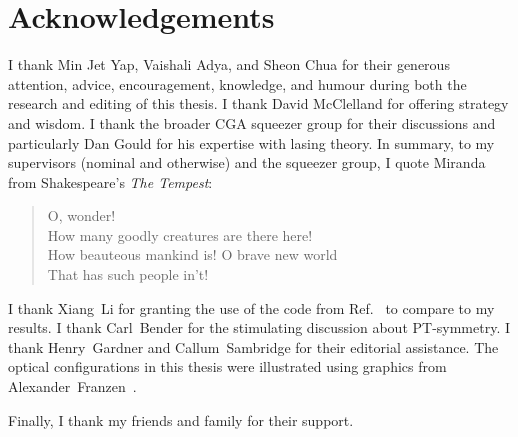 \chapter*{Acknowledgements}

I thank Min Jet Yap, Vaishali Adya, and Sheon Chua for their generous attention, advice, encouragement, knowledge, and humour during both the research and editing of this thesis.
I thank David McClelland for offering strategy and wisdom.
I thank the broader CGA squeezer group for their discussions and particularly Dan Gould for his expertise with lasing theory. %
In summary, to my supervisors (nominal and otherwise) and the squeezer group, I quote Miranda from Shakespeare's \emph{The Tempest}:
\begin{quote}
O, wonder! \\ How many goodly creatures are there here! \\ How beauteous mankind is! O brave new world \\ That has such people in't!
\end{quote}

I thank Xiang~Li for granting the use of the code from Ref.~\cite{liBroadbandSensitivityImprovement2020} to compare to my results. I thank Carl~Bender for the stimulating discussion about PT-symmetry.
I thank Henry~Gardner and Callum~Sambridge for their editorial assistance.
The optical configurations in this thesis were illustrated using graphics from Alexander~Franzen~\cite{ComponentLibrary}.

Finally, I thank my friends and family for their support.


